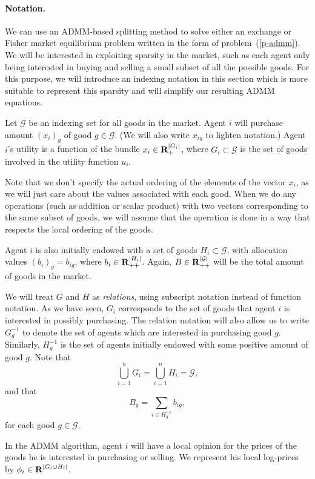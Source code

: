 \documentclass[12pt]{article}
\begin{document}
\paragraph{Notation.}

We can use an ADMM-based splitting method \cite{boyd2011distributed} to solve
either an exchange or Fisher market equilibrium problem written in the form of
problem~(\ref{p-admm}). We will be interested in exploiting sparsity in the
market, such as each agent only being interested in buying and selling a small
subset of all the possible goods. For this purpose, we will introduce an
indexing notation in this section which is more suitable to represent this
sparsity and will simplify our resulting ADMM equations.

Let $\mathcal{G}$ be an indexing set for all goods
in the market.
Agent $i$ will purchase amount $(x_i)_g$ of good $g \in \mathcal{G}$.
(We will also write $x_{ig}$ to lighten notation.)
Agent $i$'s utility is a function of the bundle $x_i \in {\mbox{\bf R}}_{+}^{|G_i|}$,
where $G_i \subset \mathcal{G}$ is the set of goods involved in the utility
function $u_i$.

Note that we don't specify the actual ordering of the elements
of the vector $x_i$, as we will just care about the values associated with
each good.
When we do any operations (such as addition or scalar product) with
two vectors corresponding to the same subset of goods, we will
assume that the operation is done in a way that respects the local ordering of
the goods.

Agent $i$ is also initially endowed with a set of goods
$H_i \subset \mathcal{G}$,
with allocation values $(b_i)_g = b_{ig}$, where $b_i \in {\mbox{\bf R}}_{++}^{|H_i|}$.
Again, $B \in {\mbox{\bf R}}^{|\mathcal{G}|}_{++}$ will be the total amount of goods in the market.


We will treat $G$ and $H$ as \emph{relations}, using subscript notation instead
of function notation. As we have seen, $G_i$ corresponds to the set of goods
that agent $i$ is interested in possibly purchasing. The relation notation will
also allow us to write $G^{-1}_g$ to denote the set of agents which are
interested in purchasing good $g$. Similarly, $H^{-1}_g$ is the set of agents
initially endowed with some positive amount of good $g$. Note that
\[
\bigcup_{i=1}^n G_i = \bigcup_{i=1}^n H_i = \mathcal{G},
\]
and that
\[
B_g = \sum\limits_{i \in H^{-1}_g} b_{ig},
\]
for each good $g \in \mathcal{G}$.

In the ADMM algorithm, agent $i$ will have a local opinion for the prices
of the goods he is interested in purchasing or selling.
We represent his local log-prices
by $\phi_i \in {\mbox{\bf R}}^{|G_i \cup H_i|}$.
\end{document}
